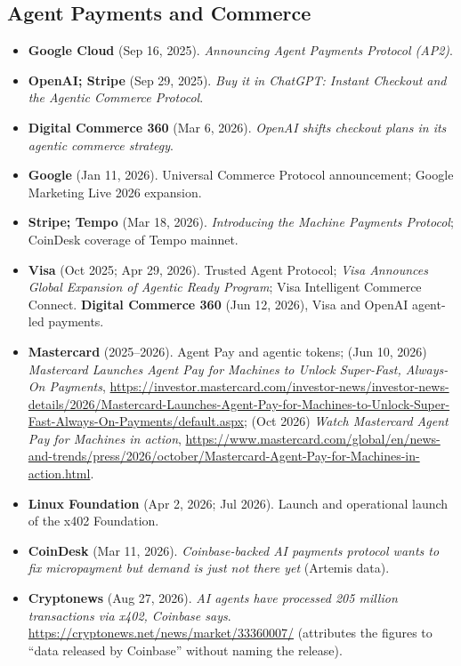 \documentclass[11pt,letterpaper]{article}
\begin{document}
\subsection*{Agent Payments and Commerce}
\begin{itemize}
  \item \textbf{Google Cloud} (Sep 16, 2025). \textit{Announcing Agent Payments Protocol (AP2)}.
  \item \textbf{OpenAI; Stripe} (Sep 29, 2025). \textit{Buy it in ChatGPT: Instant Checkout and the Agentic Commerce Protocol}.
  \item \textbf{Digital Commerce 360} (Mar 6, 2026). \textit{OpenAI shifts checkout plans in its agentic commerce strategy}.
  \item \textbf{Google} (Jan 11, 2026). Universal Commerce Protocol announcement; Google Marketing Live 2026 expansion.
  \item \textbf{Stripe; Tempo} (Mar 18, 2026). \textit{Introducing the Machine Payments Protocol}; CoinDesk coverage of Tempo mainnet.
  \item \textbf{Visa} (Oct 2025; Apr 29, 2026). Trusted Agent Protocol; \textit{Visa Announces Global Expansion of Agentic Ready Program}; Visa Intelligent Commerce Connect. \textbf{Digital Commerce 360} (Jun 12, 2026), Visa and OpenAI agent-led payments.
  \item \textbf{Mastercard} (2025--2026). Agent Pay and agentic tokens; (Jun 10, 2026) \textit{Mastercard Launches Agent Pay for Machines to Unlock Super-Fast, Always-On Payments}, \url{https://investor.mastercard.com/investor-news/investor-news-details/2026/Mastercard-Launches-Agent-Pay-for-Machines-to-Unlock-Super-Fast-Always-On-Payments/default.aspx}; (Oct 2026) \textit{Watch Mastercard Agent Pay for Machines in action}, \url{https://www.mastercard.com/global/en/news-and-trends/press/2026/october/Mastercard-Agent-Pay-for-Machines-in-action.html}.
  \item \textbf{Linux Foundation} (Apr 2, 2026; Jul 2026). Launch and operational launch of the x402 Foundation.
  \item \textbf{CoinDesk} (Mar 11, 2026). \textit{Coinbase-backed AI payments protocol wants to fix micropayment but demand is just not there yet} (Artemis data).
  \item \textbf{Cryptonews} (Aug 27, 2026). \textit{AI agents have processed 205 million transactions via x402, Coinbase says}. \url{https://cryptonews.net/news/market/33360007/} (attributes the figures to ``data released by Coinbase'' without naming the release).

\end{itemize}
\end{document}
